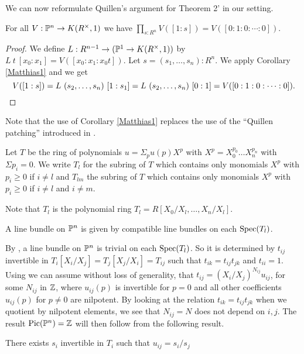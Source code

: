 We can now reformulate Quillen's argument for Theorem 2' \cite{Quillen} in our setting.

\begin{proposition}\label{trivial}
  For all $V:\mathbb{P}^n\rightarrow K(R^{\times},1)$ we have ${\prod_{s:R^n}V([1:s]) = V([0:1:0:\cdots :0])}$.
\end{proposition}

\begin{proof}
  We define $L:R^{n-1}\rightarrow (\mathbb{P}^1 \to K(R^{\times},1))$ by $L~t~[x_0:x_1] = V([x_0:x_1:x_0t])$.
  Let $s=(s_1,\dots,s_{n}):R^{n}$. We apply Corollary \ref{Matthias1} and we get
  \[
   V([1:s]) = L~(s_2,\dots,s_n)~[1:s_1] = L~(s_2,\dots,s_n)~[0:1] = V([0:1:0:\cdots :0])
   \rlap{.}
  \]
\end{proof}

 Note that the use of Corollary \ref{Matthias1} replaces the use of the ``Quillen patching''
 \cite{lombardi-quitte} introduced in \cite{Quillen}.

\medskip

Let $T$ be the ring of polynomials $u = \Sigma_p u(p)X^p$ with
$X^p = X_0^{p_0}\dots X_n^{p_n}$ with $\Sigma p_i = 0$. We write $T_l$ for the subring
of $T$ which contains only monomials $X^p$ with $p_i\geqslant 0$ if $i\neq l$
and $T_{lm}$ the subring of $T$ 
which contains only monomials $X^p$ with $p_i\geqslant 0$ if $i\neq l$ and $i\neq m$.

Note that $T_l$ is the polynomial ring $T_l = R[X_0/X_l,\dots,X_n/X_l]$.

A line bundle on $\mathbb{P}^n$ is given by compatible line bundles on each $\operatorname{Spec}(T_l)$.

By , a line bundle on $\mathbb{P}^n$ is trivial on each $\operatorname{Spec}(T_l)$.
So it is determined by $t_{ij}$ invertible in $T_i[X_i/X_j] = T_j[X_j/X_i] = T_{ij}$
such that $t_{ik} = t_{ij}t_{jk}$ and $t_{ii} = 1$. 
Using  we can assume without loss of generality, that
$t_{ij} = (X_i/X_j)^{N_{ij}} u_{ij}$, for some $N_{ij}$ in $\mathbb{Z}$, where $u_{ij}(p)$ is invertible for $p = 0$
and all other coefficients $u_{ij}(p)$ for $p\neq 0$
are nilpotent. By looking at the relation  $t_{ik} = t_{ij}t_{jk}$ when we quotient by nilpotent elements, we see that
$N_{ij} = N$ does not depend on $i,j$.
The result $\mathrm{Pic}(\mathbb{P}^n) = \mathbb{Z}$ will then follow from the following result.

\begin{proposition}
  There exists $s_i$ invertible in $T_i$ such that $u_{ij} = s_i/s_j$ 
\end{proposition}

